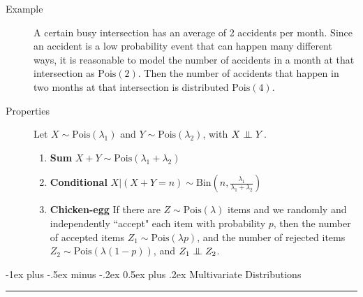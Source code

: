 \documentclass[6pt,landscape]{article}
\makeatletter
\newcommand\independent{\protect\mathpalette{\protect\independenT}{\perp}}
\def\independenT#1#2{\mathrel{\setbox0\hbox{$#1#2$}%
    \copy0\kern-\wd0\mkern4mu\box0}}
\newcommand{\Bin}{\textrm{Bin}}
\newcommand{\Pois}{\textrm{Pois}}
\renewcommand{\section}{\@startsection{section}{1}{0mm}%
                                {-1ex plus -.5ex minus -.2ex}%
                                {0.5ex plus .2ex}%
                                {\normalfont\large\bfseries}}
\makeatother
\begin{document}
\begin{multicols*}{3}
\begin{description}
    \item[Example] A certain busy intersection has an average of 2 accidents per month. Since an accident is a low probability event that can happen many different ways, it is reasonable to model the number of accidents in a month at that intersection as $\Pois(2)$. Then the number of accidents that happen in two months at that intersection is distributed $\Pois(4)$.
    
    \item[Properties]
Let $X \sim \Pois(\lambda_1)$ and $Y \sim \Pois(\lambda_2)$, with $X \independent Y$.

\begin{enumerate}
    \item \textbf{Sum} $X + Y \sim \Pois(\lambda_1 + \lambda_2)$
    \item \textbf{Conditional} $X | (X + Y = n) \sim \Bin\left(n, \frac{\lambda_1}{\lambda_1 + \lambda_2}\right)$
    \item \textbf{Chicken-egg} If there are $Z \sim \Pois(\lambda)$ items and we randomly and independently ``accept" each item with probability $p$, then the number of accepted items $Z_1 \sim \Pois(\lambda p)$, and the number of rejected items $Z_2 \sim \Pois(\lambda (1-p))$, and $Z_1 \independent Z_2$.
\end{enumerate}
    
\end{description}


\section{Multivariate Distributions} \smallskip \hrule height 2pt \smallskip



\end{multicols*}
\end{document}
